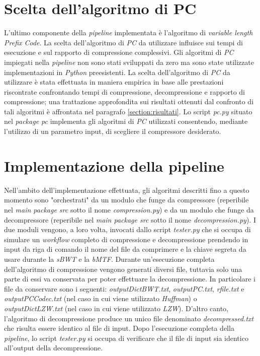 \section{Scelta dell'algoritmo di PC} 
L'ultimo componente della \emph{pipeline} implementata è l'algoritmo di \emph{variable length Prefix Code}. La scelta dell'algoritmo di \emph{PC} da utilizzare influisce sui tempi di esecuzione e sul rapporto di compressione complessivi. Gli algoritmi di \emph{PC} impiegati nella \emph{pipeline} non sono stati sviluppati da zero ma sono state utilizzate implementazioni in \emph{Python} preesistenti. La scelta dell'algoritmo di \emph{PC} da utilizzare è stata effettuata in maniera empirica in base alle prestazioni riscontrate confrontando tempi di compressione, decompressione e rapporto di compressione; una trattazione approfondita sui risultati ottenuti dal confronto di tali algoritmi è affrontata nel paragrafo \ref{section:risultati}. Lo script \emph{pc.py} situato nel \emph{package pc} implementa gli algoritmi di \emph{PC} utilizzati consentendo, mediante l'utilizzo di un parametro input, di scegliere il compressore desiderato. 
\section{Implementazione della pipeline}
Nell'ambito dell'implementazione effettuata, gli algoritmi descritti fino a questo momento sono "orchestrati" da un modulo che funge da compressore (reperibile nel \emph{main package src} sotto il nome \emph{compression.py}) e da un modulo che funge da decompressore (reperibile nel \emph{main package src} sotto il nome \emph{decompression.py}). I due moduli vengono, a loro volta, invocati dallo script \emph{tester.py} che si occupa di simulare un \emph{workflow} completo di compressione e decompressione prendendo in input da riga di comando il nome del file da comprimere e la chiave segreta da usare durante la \emph{sBWT} e la \emph{bMTF}. Durante un'esecuzione completa dell'algoritmo di compressione vengono generati diversi file, tuttavia solo una parte di essi va conservata per poter effettuare la decompressione. In particolare i file da conservare sono i seguenti: \emph{outputDictBWT.txt}, \emph{outputPC.txt}, \emph{rfile.txt} e \emph{outputPCCodec.txt} (nel caso in cui viene utilizzato \emph{Huffman}) o \emph{outputDictLZW.txt} (nel caso in cui viene utilizzato \emph{LZW}). D'altro canto, l'algoritmo di decompressione produce un unico file denominato \emph{decompressed.txt} che risulta essere identico al file di input. Dopo l'esecuzione completa della \emph{pipeline}, lo script \emph{tester.py} si occupa di verificare che il file di input sia identico all'output della decompressione.